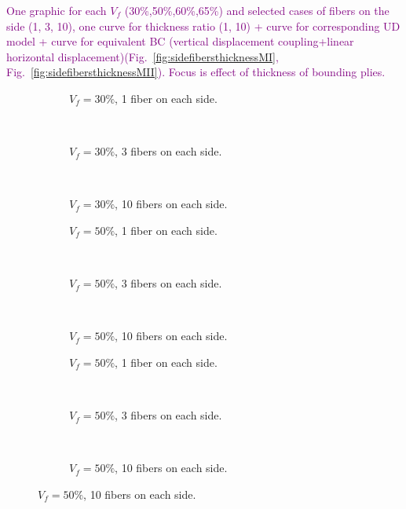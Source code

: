 \documentclass[review]{elsarticle}
\begin{document}
\textcolor{purple}{One graphic for each $V_{f}$ (30\%,50\%,60\%,65\%) and selected cases of fibers on the side (1, 3,  10),  one curve for thickness ratio (1, 10) + curve for corresponding UD model + curve for equivalent BC (vertical displacement coupling+linear horizontal displacement)(Fig.~\ref{fig:sidefibersthicknessMI},  Fig.~\ref{fig:sidefibersthicknessMII}). Focus is effect of thickness of bounding plies.}\\

\begin{figure}[!h]
\centering
    \begin{subfigure}[b]{0.3\textwidth}
        \caption{$V_{f}=30\%$, 1 fiber on each side.}\label{subfig:sidefiber30MIcase1}
    \end{subfigure} ~
   \begin{subfigure}[b]{0.3\textwidth}
        \caption{$V_{f}=30\%$, 3 fibers on each side.}\label{subfig:sidefiber30MIcase2}
    \end{subfigure} ~
\begin{subfigure}[b]{0.3\textwidth}
        \caption{$V_{f}=30\%$, 10 fibers on each side.}\label{subfig:sidefiber30MIcase3}
    \end{subfigure}

    \begin{subfigure}[b]{0.3\textwidth}
        \caption{$V_{f}=50\%$, 1 fiber on each side.}\label{subfig:sidefiber50MIcase1}
    \end{subfigure} ~
   \begin{subfigure}[b]{0.3\textwidth}
        \caption{$V_{f}=50\%$, 3 fibers on each side.}\label{subfig:sidefiber50MIcase2}
    \end{subfigure} ~
\begin{subfigure}[b]{0.3\textwidth}
        \caption{$V_{f}=50\%$, 10 fibers on each side.}\label{subfig:sidefiber50MIcase3}
    \end{subfigure}

    \begin{subfigure}[b]{0.3\textwidth}
        \caption{$V_{f}=50\%$, 1 fiber on each side.}\label{subfig:sidefiber60MIcase1}
    \end{subfigure} ~
   \begin{subfigure}[b]{0.3\textwidth}
        \caption{$V_{f}=50\%$, 3 fibers on each side.}\label{subfig:sidefiber60MIcase2}
    \end{subfigure} ~
\begin{subfigure}[b]{0.3\textwidth}
        \caption{$V_{f}=50\%$, 10 fibers on each side.}\label{subfig:sidefiber60MIcase3}
    \end{subfigure}


\end{figure}
\end{document}
